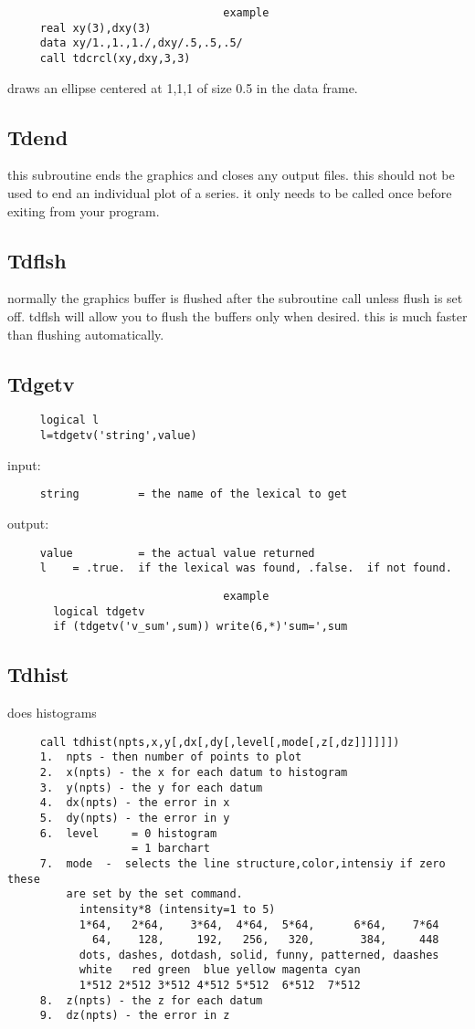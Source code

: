 \begin{verbatim}
                                 example
     real xy(3),dxy(3) 
     data xy/1.,1.,1./,dxy/.5,.5,.5/ 
     call tdcrcl(xy,dxy,3,3) 
\end{verbatim}
draws an ellipse centered at 1,1,1 of size 0.5 in the data frame.  
\subsection{Tdend}
this  subroutine  ends  the  graphics  and closes any output files.  this
should not be used to end an individual plot of a series.  it only  needs
to be called once before exiting from your program.  
\subsection{Tdflsh}
normally  the graphics buffer is flushed after the subroutine call unless
flush is set off.  tdflsh will allow you to flush the buffers  only  when
desired.  this is much faster than flushing automatically.  
\subsection{Tdgetv}
\begin{verbatim}
     logical l 
     l=tdgetv('string',value) 
\end{verbatim}
input:  
\begin{verbatim}
     string         = the name of the lexical to get 
\end{verbatim}
output:  
\begin{verbatim}
     value          = the actual value returned 
     l    = .true.  if the lexical was found, .false.  if not found.  
\end{verbatim}

\begin{verbatim}
                                 example
       logical tdgetv 
       if (tdgetv('v_sum',sum)) write(6,*)'sum=',sum 
\end{verbatim}
\subsection{Tdhist}
does histograms 
\begin{verbatim}
     call tdhist(npts,x,y[,dx[,dy[,level[,mode[,z[,dz]]]]]]) 
     1.  npts - then number of points to plot 
     2.  x(npts) - the x for each datum to histogram 
     3.  y(npts) - the y for each datum 
     4.  dx(npts) - the error in x 
     5.  dy(npts) - the error in y 
     6.  level     = 0 histogram 
                   = 1 barchart 
     7.  mode  -  selects the line structure,color,intensiy if zero these
         are set by the set command.  
           intensity*8 (intensity=1 to 5) 
           1*64,   2*64,    3*64,  4*64,  5*64,      6*64,    7*64 
             64,    128,     192,   256,   320,       384,     448 
           dots, dashes, dotdash, solid, funny, patterned, daashes 
           white   red green  blue yellow magenta cyan 
           1*512 2*512 3*512 4*512 5*512  6*512  7*512 
     8.  z(npts) - the z for each datum 
     9.  dz(npts) - the error in z 
\end{verbatim}
